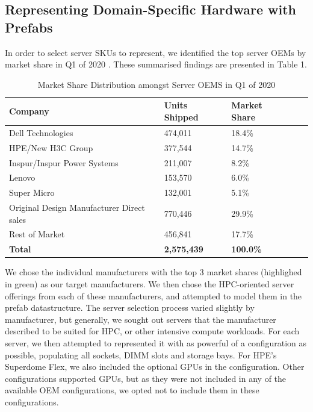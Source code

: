 \documentclass[11pt]{article}
\begin{document}
	\subsection{Representing Domain-Specific Hardware with Prefabs}
		In order to select server SKUs to represent, we identified the top server OEMs by market share in Q1 of 2020 \cite{Macatee2020}. These summarised findings are presented in Table 1.
		\begin{table}[]
		\centering
		\begin{tabular}{|l|ll|ll}
		\cline{1-3}
		Company                                             & Units Shipped                   & Market Share                     \\ \hline
		\cellcolor[HTML]{9AFF99}Dell Technologies           & \cellcolor[HTML]{9AFF99}474,011 & \cellcolor[HTML]{9AFF99}18.4\%   \\
		\cellcolor[HTML]{9AFF99}HPE/New H3C Group           & \cellcolor[HTML]{9AFF99}377,544 & \cellcolor[HTML]{9AFF99}14.7\%   \\
		\cellcolor[HTML]{9AFF99}Inspur/Inspur Power Systems & \cellcolor[HTML]{9AFF99}211,007 & \cellcolor[HTML]{9AFF99}8.2\%    \\
		Lenovo                                              & 153,570                         & 6.0\%                            \\
		Super Micro                                         & 132,001                         & 5.1\%                            \\
		Original Design Manufacturer Direct sales                                         & 770,446                         & 29.9\%                           \\
		Rest of Market                                      & 456,841                         & 17.7\%                           \\ \cline{1-3}
		\textbf{Total}                                      & \textbf{2,575,439}              & \textbf{100.0\%}                 \\ \cline{1-3}
		\end{tabular}
		\caption{Market Share Distribution amongst Server OEMS in Q1 of 2020}
		\label{table:1}
		\end{table}
		We chose the individual manufacturers with the top 3 market shares (highlighed in green) as our target manufacturers.
		We then chose the HPC-oriented server offerings from each of these manufacturers, and attempted to model them in the prefab datastructure.
		The server selection process varied slightly by manufacturer, but generally, we sought out servers that the manufacturer described to be suited for HPC, or other intensive compute workloads.
		For each server, we then attempted to represented it with as powerful of a configuration as possible, populating all sockets, DIMM slots and storage bays.
		For HPE's Superdome Flex, we also included the optional GPUs in the configuration.
		Other configurations supported GPUs, but as they were not included in any of the available OEM configurations, we opted not to include them in these configurations.
\end{document}
